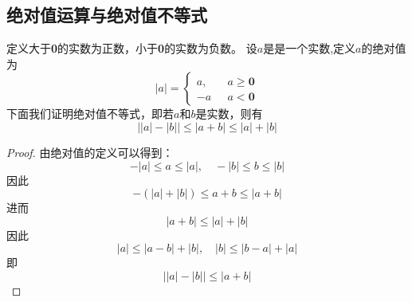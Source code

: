 \documentclass[12pt, a4paper, oneside]{ctexart}
\begin{document}
\subsection{绝对值运算与绝对值不等式}
定义大于\textbf{0}的实数为正数，小于\textbf{0}的实数为负数。
设$a$是是一个实数,定义$a$的绝对值为
\begin{equation*}
    |a|=
    \begin{cases}
        a, \quad & a\ge \textbf{0} \\
        -a       & a<\textbf{0}
    \end{cases}
\end{equation*}
下面我们证明绝对值不等式，即若$a$和$b$是实数，则有
\begin{equation*}
    \left||a|-|b| \right|  \le |a+b|\le |a|+|b|
\end{equation*}
\begin{proof}
    由绝对值的定义可以得到：
    \begin{equation*}
        -|a| \le a \le |a|, \quad   -|b| \le b \le |b|
    \end{equation*}
    因此
    \begin{equation*}
        -(|a|+|b|)  \le a+b \le |a+b|
    \end{equation*}
    进而
    \begin{equation*}
        |a+b|\le |a|+|b|
    \end{equation*}
    因此
    \begin{equation*}
        |a|\le |a-b|+|b|,\quad |b|\le |b-a|+|a|
    \end{equation*}
    即
    \begin{equation*}
        \left||a|-|b| \right|  \le |a+b|
    \end{equation*}
\end{proof}
\end{document}
